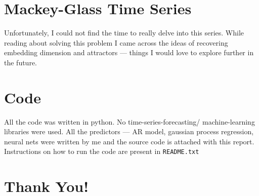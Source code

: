\documentclass[11pt]{report}
\begin{document}
\section*{Mackey-Glass Time Series}
Unfortunately, I could not find the time to really delve into this series. While reading about solving this problem I came across the ideas of recovering embedding dimension and attractors --- things I would love to explore further in the future.
\section*{Code}
All the code was written in python. No time-series-forecasting/ machine-learning libraries were used. All the predictors --- AR model, gaussian process regression, neural nets were written by me and the source code is attached with this report. Instructions on how to run the code are present in \texttt{README.txt}
\section*{Thank You!}
\end{document}
